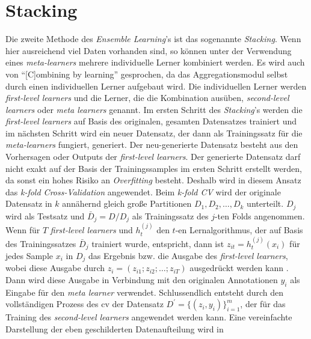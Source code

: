 \section{Stacking}
Die zweite Methode des \textit{Ensemble Learning}'s ist das sogenannte \textit{Stacking}. Wenn hier ausreichend viel Daten vorhanden sind, so können unter der Verwendung eines \textit{meta-learners} mehrere individuelle Lerner kombiniert werden. Es wird auch von \enquote{[C]ombining by learning}\autocite[S.196]{Zhou.2021} gesprochen, da das Aggregationsmodul selbst durch einen individuellen Lerner aufgebaut wird. Die individuellen Lerner werden \textit{first-level learners} und die Lerner, die die Kombination ausüben, \textit{second-level learners} oder \textit{meta learners} genannt. Im ersten Schritt des \textit{Stacking}'s werden die \textit{first-level learners} auf Basis des originalen, gesamten Datensatzes trainiert und im nächsten Schritt wird ein neuer Datensatz, der dann als Trainingssatz für die \textit{meta-learners} fungiert, generiert. Der neu-generierte Datensatz besteht aus den Vorhersagen oder Outputs der \textit{first-level learners}. Der generierte Datensatz darf nicht exakt auf der Basis der Trainingssamples im ersten Schritt erstellt werden, da sonst ein hohes Risiko an \textit{Overfitting} besteht. Deshalb wird in diesem Ansatz das \textit{k-fold Cross-Validation} angewendet. Beim \textit{k-fold CV} wird der originale Datensatz in $k$ annähernd gleich große Partitionen $D_1, D_2,\dots, D_k$ unterteilt. $D_j$ wird als Testsatz und $\bar{D}_j = D/D_j$ als Trainingssatz des $j$-ten Folds angenommen. 
Wenn für $T$ \textit{first-level learners} und $h_{t}^{(j)}$ den $t$-en Lernalgorithmus, der auf Basis des Trainingssatzes $\bar{D}_j$ trainiert wurde, entspricht, dann ist $z_{it} = h_{t}^{(j)}(x_i)$ für jedes Sample $x_i$ in $D_j$ das Ergebnis bzw. die Ausgabe des \textit{first-level learners}, wobei diese Ausgabe durch $z_i = (z_{i1}; z_{i2}; \dots; z_{iT})$ ausgedrückt werden kann \autocite[vgl. S.197,29]{Zhou.2021} \autocite[vgl. S84f.]{Zhou.2012}. 
Dann wird diese Ausgabe in Verbindung mit den originalen Annotationen $y_i$ als Eingabe für den \textit{meta learner} verwendet. Schlussendlich entsteht durch den vollständigen Prozess des \gls{cv} der Datensatz $D^{'}=\{(z_i, y_i)\}_{i=1}^{m}$, der für das Training des \textit{second-level learners} angewendet werden kann. Eine vereinfachte Darstellung der eben geschilderten Datenaufteilung wird in 

